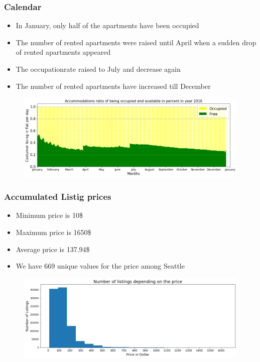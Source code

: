 \documentclass{beamer}
\begin{document}
\begin{frame}
\frametitle{Calendar}
\begin{itemize}
\item In January, only half of the apartments have been occupied
\item The number of rented apartments were raised until April when a sudden drop of rented apartments appeared 
\item The occupationrate raised to July and decrease again
\item The number of rented apartments have increased till December 
\end{itemize}
\begin{figure}
\includegraphics[width=0.8\linewidth]{photo/11_acc_ratio_occupied}
\end{figure}
\end{frame}


\begin{frame}
\frametitle{Accumulated Listig prices}
\begin{itemize}
\item Minimum price is 10\$
\item Maximum price is 1650\$
\item Average price is 137.94\$
\item We have 669 unique values for the price among Seattle
\end{itemize}
\begin{figure}
\includegraphics[width=0.8\linewidth]{photo/1_number_of_listings_depending_on_price}
\end{figure}
\end{frame}
\end{document}
